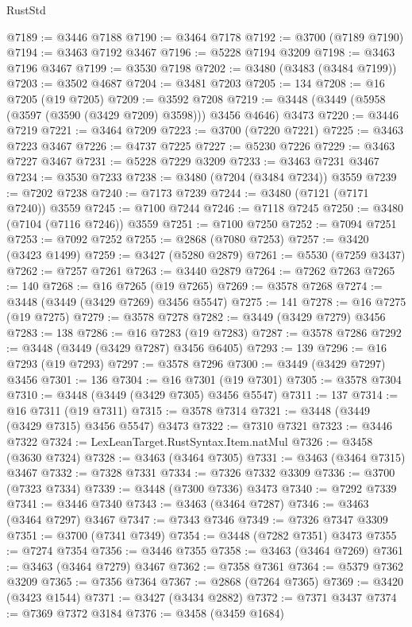 \begin{lexlean}{RustStd}
\begin{coremodule}
{\begin{coremodule}
{{{{{{{{{{{{{{{{{{{{{{{{{{{{{{{{{{{{{{{{{{{{{{{{{{{{{{{{{{{{{{{{{{{{{{{{{{{{{{{{{{{{{@7189 := @3446 @7188
@7190 := @3464 @7178
@7192 := @3700 (@7189 @7190)
@7194 := @3463 @7192 @3467
@7196 := @5228 @7194 @3209
@7198 := @3463 @7196 @3467
@7199 := @3530 @7198
@7202 := @3480 (@3483 (@3484 @7199))
@7203 := @3502 @4687
@7204 := @3481 @7203
@7205 := 134
@7208 := @16 @7205 (@19 @7205)
@7209 := @3592 @7208
@7219 := @3448 (@3449 (@5958 (@3597 (@3590 (@3429 @7209) @3598))) @3456 @4646) @3473
@7220 := @3446 @7219
@7221 := @3464 @7209
@7223 := @3700 (@7220 @7221)
@7225 := @3463 @7223 @3467
@7226 := @4737 @7225
@7227 := @5230 @7226
@7229 := @3463 @7227 @3467
@7231 := @5228 @7229 @3209
@7233 := @3463 @7231 @3467
@7234 := @3530 @7233
@7238 := @3480 (@7204 (@3484 @7234)) @3559
@7239 := @7202 @7238
@7240 := @7173 @7239
@7244 := @3480 (@7121 (@7171 @7240)) @3559
@7245 := @7100 @7244
@7246 := @7118 @7245
@7250 := @3480 (@7104 (@7116 @7246)) @3559
@7251 := @7100 @7250
@7252 := @7094 @7251
@7253 := @7092 @7252
@7255 := @2868 (@7080 @7253)
@7257 := @3420 (@3423 @1499)
@7259 := @3427 (@5280 @2879)
@7261 := @5530 (@7259 @3437)
@7262 := @7257 @7261
@7263 := @3440 @2879
@7264 := @7262 @7263
@7265 := 140
@7268 := @16 @7265 (@19 @7265)
@7269 := @3578 @7268
@7274 := @3448 (@3449 (@3429 @7269) @3456 @5547)
@7275 := 141
@7278 := @16 @7275 (@19 @7275)
@7279 := @3578 @7278
@7282 := @3449 (@3429 @7279) @3456
@7283 := 138
@7286 := @16 @7283 (@19 @7283)
@7287 := @3578 @7286
@7292 := @3448 (@3449 (@3429 @7287) @3456 @6405)
@7293 := 139
@7296 := @16 @7293 (@19 @7293)
@7297 := @3578 @7296
@7300 := @3449 (@3429 @7297) @3456
@7301 := 136
@7304 := @16 @7301 (@19 @7301)
@7305 := @3578 @7304
@7310 := @3448 (@3449 (@3429 @7305) @3456 @5547)
@7311 := 137
@7314 := @16 @7311 (@19 @7311)
@7315 := @3578 @7314
@7321 := @3448 (@3449 (@3429 @7315) @3456 @5547) @3473
@7322 := @7310 @7321
@7323 := @3446 @7322
@7324 := LexLeanTarget.RustSyntax.Item.natMul
@7326 := @3458 (@3630 @7324)
@7328 := @3463 (@3464 @7305)
@7331 := @3463 (@3464 @7315) @3467
@7332 := @7328 @7331
@7334 := @7326 @7332 @3309
@7336 := @3700 (@7323 @7334)
@7339 := @3448 (@7300 @7336) @3473
@7340 := @7292 @7339
@7341 := @3446 @7340
@7343 := @3463 (@3464 @7287)
@7346 := @3463 (@3464 @7297) @3467
@7347 := @7343 @7346
@7349 := @7326 @7347 @3309
@7351 := @3700 (@7341 @7349)
@7354 := @3448 (@7282 @7351) @3473
@7355 := @7274 @7354
@7356 := @3446 @7355
@7358 := @3463 (@3464 @7269)
@7361 := @3463 (@3464 @7279) @3467
@7362 := @7358 @7361
@7364 := @5379 @7362 @3209
@7365 := @7356 @7364
@7367 := @2868 (@7264 @7365)
@7369 := @3420 (@3423 @1544)
@7371 := @3427 (@3434 @2882)
@7372 := @7371 @3437
@7374 := @7369 @7372 @3184
@7376 := @3458 (@3459 @1684)
}}}}}}}}}}}}}}}}}}}}}}}}}}}}}}}}}}}}}}}}}}}}}}}}}}}}}}}}}}}}}}}}}}}}}}}}}}}}}}}}}}}}}
\end{coremodule}}
\end{coremodule}
\end{lexlean}
